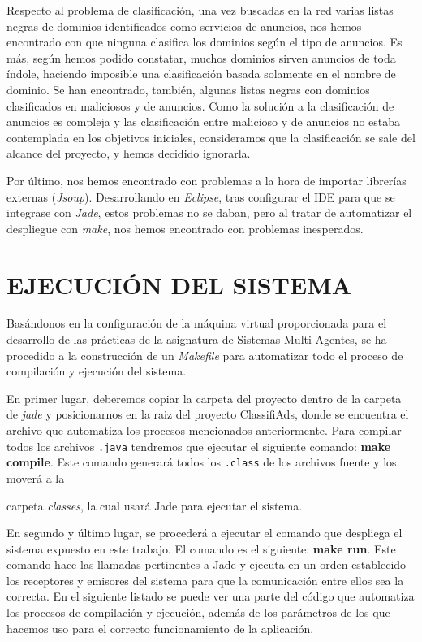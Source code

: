 \documentclass{pre-tfg}
\begin{document}
Respecto al problema de clasificación, una vez buscadas en la red varias listas negras de dominios identificados como servicios de anuncios, nos hemos encontrado
con que ninguna clasifica los dominios según el tipo de anuncios. Es más, según hemos podido constatar, muchos dominios sirven anuncios de toda índole, haciendo imposible
una clasificación basada solamente en el nombre de dominio. Se han encontrado, también, algunas listas negras con dominios clasificados en maliciosos y de anuncios. Como la
solución a la clasificación de anuncios es compleja y las clasificación entre malicioso y de anuncios no estaba contemplada en los objetivos iniciales, consideramos que la
clasificación se sale del alcance del proyecto, y hemos decidido ignorarla.

Por último, nos hemos encontrado con problemas a la hora de importar librerías externas (\textit{Jsoup}). Desarrollando en \textit{Eclipse}, tras configurar el IDE para que
se integrase con \textit{Jade}, estos problemas no se daban, pero al tratar de automatizar el despliegue con \textit{make}, nos hemos encontrado con problemas inesperados.

\section{EJECUCIÓN DEL SISTEMA}

Basándonos en la configuración de la máquina virtual proporcionada para el desarrollo de las prácticas de la asignatura de Sistemas Multi-Agentes, 
se ha procedido a la construcción de un \textit{Makefile} para automatizar todo el proceso de compilación y ejecución
del sistema.

En primer lugar, deberemos copiar la carpeta del proyecto dentro de la carpeta de \textit{jade} y posicionarnos en la raiz del proyecto ClassifiAds, 
donde se encuentra el archivo que automatiza los procesos mencionados anteriormente. Para compilar todos los archivos \verb|.java| tendremos 
que ejecutar el siguiente comando: \textbf{make compile}. Este comando generará todos los \verb|.class| de los archivos fuente y los moverá a la


carpeta \textit{classes}, la cual usará Jade para ejecutar el sistema.

En segundo y último lugar, se procederá a ejecutar el comando que despliega el sistema expuesto en este trabajo. El comando es el siguiente:
\textbf{make run}. Este comando hace las llamadas pertinentes a Jade y ejecuta en un orden establecido los receptores y emisores del sistema
para que la comunicación entre ellos sea la correcta. En el siguiente listado se puede ver una parte del código que automatiza los procesos de compilación y 
ejecución, además de los parámetros de los que hacemos uso para el correcto funcionamiento de la aplicación.
\end{document}
